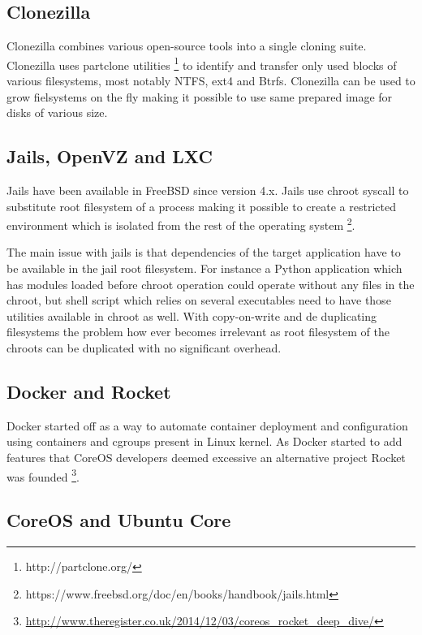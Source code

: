 \documentclass{article}
\begin{document}
\subsection{Clonezilla}

Clonezilla combines various open-source tools into a single cloning suite.
Clonezilla uses partclone utilities  \footnote{http://partclone.org/} to
identify and transfer only used blocks of various filesystems, most notably
NTFS, ext4 and Btrfs. Clonezilla can be used to grow fielsystems on the fly
making it possible to use same prepared image for disks of various size. 

\subsection{Jails, OpenVZ and LXC}

Jails have been available in FreeBSD since version 4.x. Jails use chroot
syscall to substitute root filesystem of a process making it possible to
create a restricted environment which is isolated from the rest of the
operating system
\footnote{https://www.freebsd.org/doc/en/books/handbook/jails.html}.

The main issue with jails is that dependencies of the target application have
to be available in the jail root filesystem. For instance a Python application
which has modules loaded before chroot operation could operate without any
files in the chroot, but shell script which relies on several executables need
to have those utilities available in chroot as well. With copy-on-write and de
duplicating filesystems the problem how ever becomes irrelevant as root
filesystem of the chroots can be duplicated with no significant overhead.


\subsection{Docker and Rocket}

Docker started off as a way to automate container deployment and configuration
using containers and cgroups present in Linux kernel. As Docker started to add
features that CoreOS developers deemed excessive an alternative project Rocket
was founded
\footnote{\url{http://www.theregister.co.uk/2014/12/03/coreos_rocket_deep_dive/}}.

\subsection{CoreOS and Ubuntu Core}
\end{document}
